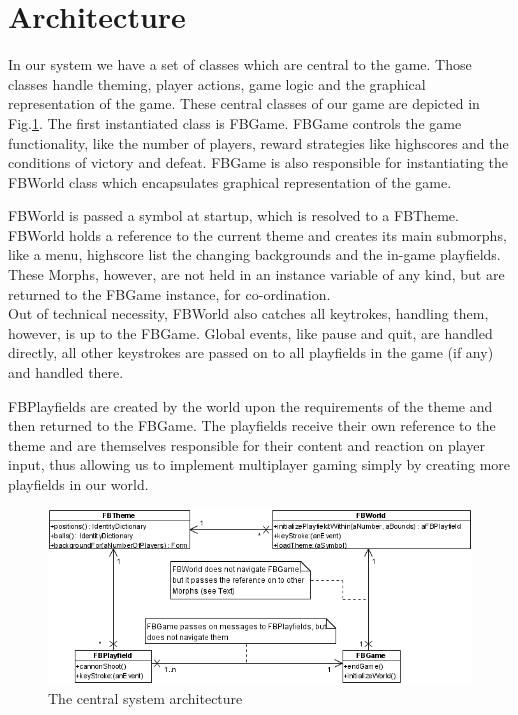 \section{Architecture}
In our system we have a set of classes which are central to the 
game. Those classes handle theming, player actions, game logic 
and the graphical representation of the game. These central
classes of our game are depicted in Fig.\ref{fig:architecture}.
%
The first instantiated class is FBGame. FBGame controls the game functionality, 
like the number of players, reward strategies like highscores and the
conditions of victory and defeat. FBGame is also responsible for instantiating
the FBWorld class which encapsulates graphical representation of the game.

FBWorld is passed a symbol at startup, which is resolved to a FBTheme. FBWorld 
holds a reference to the current theme and creates its main submorphs, like
a menu, highscore list the changing backgrounds and the in-game playfields.
These Morphs, however, are not held in an instance variable of any kind, but 
are returned to the FBGame instance, for co-ordination.\\
Out of technical necessity, FBWorld also catches all keytrokes, handling them, 
however, is up to the FBGame. Global events, like pause and quit, are handled 
directly, all other keystrokes are passed on to all playfields in the game (if any)
and handled there.

FBPlayfields are created by the world upon the requirements of the theme
and then returned to the FBGame. The playfields receive their own reference 
to the theme and are themselves responsible for their content and reaction on 
player input, thus allowing us to implement multiplayer gaming simply by creating 
more playfields in our world.
%
\begin{figure}[bt]
  \begin{center}
    \includegraphics[width=0.6\linewidth]{images/architecture.png}
  \end{center}
  \caption{The central system architecture}
  \label{fig:architecture}
\end{figure}


